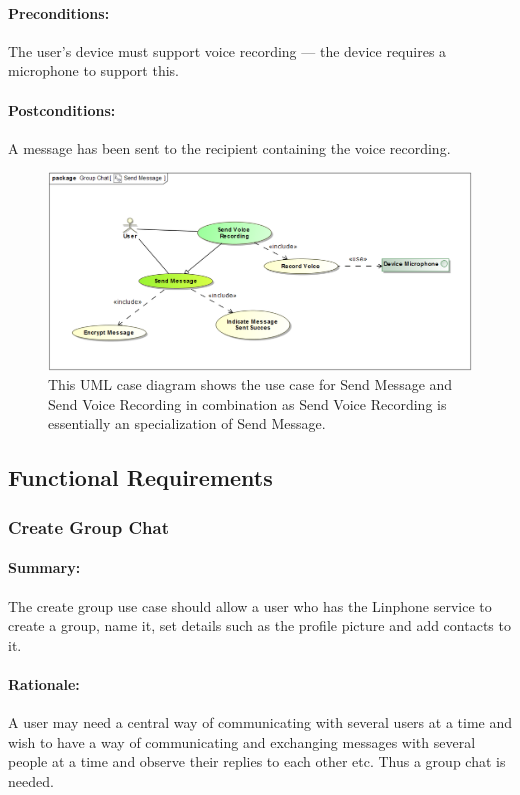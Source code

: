 \documentclass[11pt]{article}
\begin{document}
\paragraph{Preconditions:} The user's device must support voice recording --- the device requires a microphone to support this.
\paragraph{{Postconditions:}} A message has been sent to the recipient containing the voice recording.
\begin{figure}[H]
\centering
\includegraphics[width=5in]{./images/send_message_UC.png}
\caption[Send Message Use Case]{This UML case diagram shows the use case for Send Message and Send Voice Recording in combination as Send Voice Recording is essentially an specialization of Send Message.}
\label{UC-figure-send-message}
\end{figure}

\subsection{Functional Requirements}
\subsubsection{Create Group Chat} \label{FR-create-group}
\paragraph{Summary:} The create group use case should allow a user who has the Linphone service to create a group, name it, set details such as the profile picture and add contacts to it.
\paragraph{Rationale:} A user may need a central way of communicating with several users at a time and wish to have a way of communicating and exchanging messages with several people at a time and observe their replies to each other etc. Thus a group chat is needed.
\end{document}
